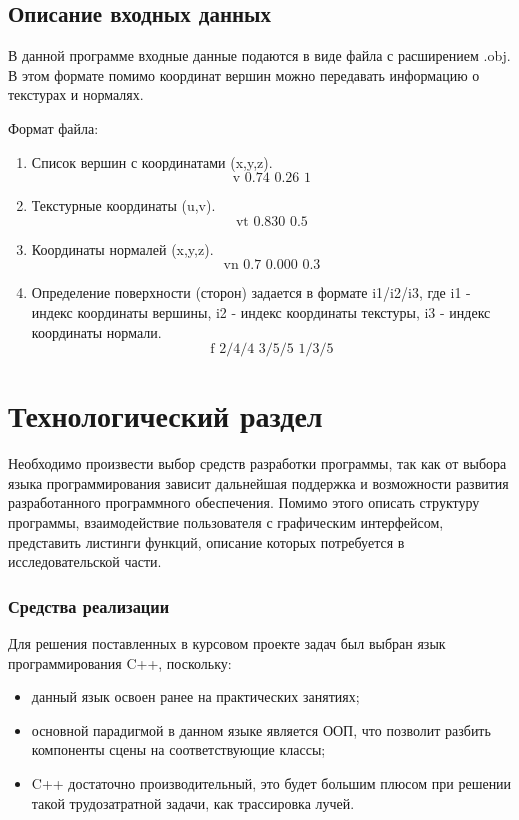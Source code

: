 \documentclass[12pt,a4paper,oneside]{report}
\begin{document}
	\section{Описание входных данных}
	 \quad В данной программе входные данные подаются в виде файла с расширением .obj. В этом формате помимо координат вершин можно передавать информацию о текстурах и нормалях. 	
	
	 Формат файла:
	
	\begin{enumerate}
		\item Список вершин с координатами (x,y,z).
		$$ \text{v 0.74 0.26 1} $$
		\item Текстурные координаты (u,v).
		$$ \text{vt 0.830 0.5} $$
		\item Координаты нормалей (x,y,z).
		$$ \text{vn 0.7 0.000 0.3} $$
		\item Определение поверхности (сторон) задается в формате i1/i2/i3, где i1 - индекс координаты вершины, i2 - индекс координаты текстуры, i3 - индекс координаты нормали.
		$$ \text{f 2/4/4 3/5/5 1/3/5} $$
	\end{enumerate}
		
	\chapter{Технологический раздел}
	 \quad Необходимо произвести выбор средств разработки программы, так как от выбора языка программирования зависит дальнейшая поддержка и возможности развития разработанного программного обеспечения. Помимо этого описать структуру программы, взаимодействие пользователя с графическим интерфейсом, представить листинги функций, описание которых потребуется в исследовательской части.
	
	\subsection{Средства реализации}
	 \quad Для решения поставленных в курсовом проекте задач был выбран язык программирования C++, поскольку:
	\begin{itemize}
		\item данный язык освоен ранее на практических занятиях;
		\item основной парадигмой в данном языке является ООП, что позволит разбить компоненты сцены на соответствующие классы; 
		\item C++ достаточно производительный, это будет большим плюсом при решении такой трудозатратной задачи, как трассировка лучей. 
	\end{itemize}
\end{document}
